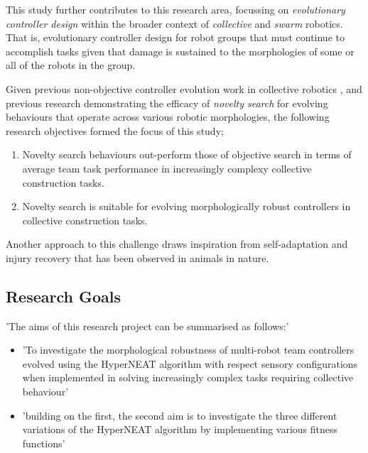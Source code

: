 This study further contributes to this research area, focussing on \textit{evolutionary controller design} \cite{FloreanoDurrMattiussi2008} within the broader context of \textit{collective} \cite{KubeZhang1994B} and \textit{swarm} \cite{Beni2004} robotics.
That is, evolutionary controller design for robot groups that must continue to accomplish tasks given that damage is sustained to the morphologies of some or all of the robots in the group.



Given previous non-objective controller evolution work in collective robotics
\cite{gomes2013generic}
\cite{RefWorks:5}
\cite{RefWorks:11},
and previous research demonstrating the efficacy of \textit{novelty search} \cite{lehman2011abandoning} for evolving behaviours that operate across various robotic morphologies, the following research objectives formed the focus of this study;

\begin{enumerate}
	\item Novelty search behaviours out-perform those of objective search in terms of average team task performance in increasingly complexy collective construction tasks.
	\item Novelty search is suitable for evolving morphologically robust controllers in collective construction tasks.
\end{enumerate}


Another approach to this challenge draws inspiration from self-adaptation and injury recovery that has been observed in animals in nature.






\subsection{Research Goals}

'The aims of this research project can be summarised as follows:'
\begin{itemize}
	\item 'To investigate the morphological robustness of multi-robot team controllers evolved using the HyperNEAT algorithm with respect sensory configurations when implemented in solving increasingly complex tasks requiring collective behaviour'
	\item 'building on the first, the second aim is to investigate the three different variations of the HyperNEAT algorithm by implementing various fitness functions'
\end{itemize}

